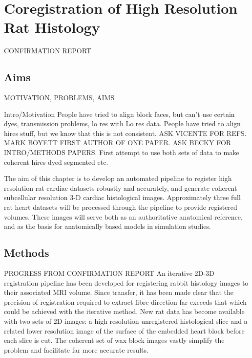 \chapter{Coregistration of High Resolution Rat Histology}
\dblspace
\begin{quote}{\em }\end{quote}

CONFIRMATION REPORT
\section{Aims}
  MOTIVATION, PROBLEMS, AIMS
  
  Intro/Motivation
  People have tried to align block faces, but can't use certain dyes, transmission problems, lo res with Lo res data.
  People have tried to align hires stuff, but we know that this is not consistent.
  ASK VICENTE FOR REFS. MARK BOYETT FIRST AUTHOR OF ONE PAPER. ASK BECKY FOR INTRO/METHODS PAPERS.
  First attempt to use both sets of data to make coherent hires dyed segmented etc.
  
  The aim of this chapter is to develop an automated pipeline to register high resolution rat cardiac datasets robustly and accurately, and generate coherent subcellular resolution 3-D cardiac histological images.  Approximately three full rat heart datasets will be processed through the pipeline to provide registered volumes. These images will serve both as an authoritative anatomical reference, and as the basis for anatomically based models in simulation studies.

\section{Methods} %

PROGRESS FROM CONFIRMATION REPORT 
An iterative 2D-3D registration pipeline has been developed for registering rabbit histology images to their associated MRI volume. Since transfer, it has been made clear that the precision of registration required to extract fibre direction far exceeds that which could be achieved with the iterative method. New rat data has become available with two sets of 2D images: a high resolution unregistered histological slice and a related lower resolution image of the surface of the embedded heart block before each slice is cut. The coherent set of wax block images vastly simplify the problem and facilitate far more accurate results.


